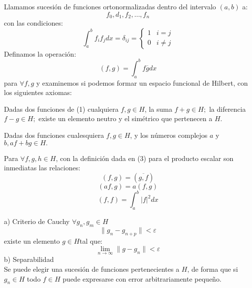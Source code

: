 Llamamos sucesión de funciones ortonormalizadas dentro del intervalo $ (a, b) $ a:\\
\begin{equation}
	f_{0}, d_{1}, f_{2}, \ldots, f_{n}
\end{equation}
con las condiciones:
\begin{equation}
\int_{a}^{b} f_{i}f_{j}dx = \delta_{ij} = 
\left\{ \begin{array}{lcl}
	 	1  & i  = j\\
	    0 & i \not = j
\end{array}
\right.
\end{equation}
Definamos la operación:
\begin{equation}
(f, g) = \int_{a}^{b} f \overline{g}dx
\end{equation}
para $\forall f, g$ y examinemos si podemos formar un espacio funcional de Hilbert, con los siguientes axiomas:
\setcounter{axi}{0}%
\begin{axi}
	Dadas  dos funciones de (1) cualquiera $ f ,  g \in H$, la suma $ f + g \in H; $ la diferencia  $ f - g \in H; $ existe un elemento neutro y el simétrico que pertenecen a $ H $.
\end{axi}
\begin{axi}
	Dadas  dos funciones cualesquiera  $ f ,  g \in H$, y los números complejos $a$ y $ b, af +bg \in H. $
\end{axi}
\begin{axi}
	Para $\forall f, g, h \in H$, con la definición dada en (3) para el producto escalar son inmediatas las relaciones:
	\[ (f, g) = (\overline{g, f}) \]
	\begin{equation}
	(af, g) = a(f, g)
	\end{equation}
	\[ (f, f) = \int_{a}^{b}|f|^{2}dx \]
\end{axi}
\begin{axi}[ DE CONVERGENCIA] 

	a) Criterio de Cauchy
	$ \forall g_{n}, g_{m} \in H $
	\begin{equation}
	\parallel g_{n} - g_{n+p} \parallel < \varepsilon
	\end{equation}
	existe un elemento $ g \in H  $tal que:
	\begin{equation}
	\lim\limits_{n \rightarrow \infty} \parallel g - g_{n} \parallel < \varepsilon
	\end{equation}
	b) Separabilidad\\
	Se puede elegir una sucesión de funciones pertenecientes a $ H $, de forma que si $ g_{n} \in H $
	todo $ f \in H $ puede expresarse con error arbitrariamente pequeño.
\end{axi}
